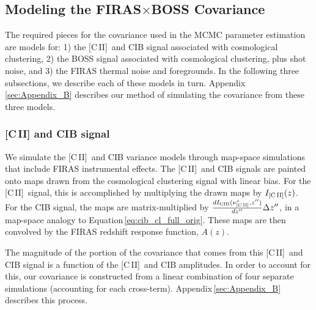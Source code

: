 \documentclass[fleqn,usenatbib]{mnras}
\newcommand{\cii}{[C{\sc\,II}]}
\newcommand{\FB}{FIRAS${\times}$BOSS}
\begin{document}
\subsection{Modeling the \texorpdfstring{\FB}{FIRASxBOSS} Covariance}
\label{subsec:FB_cov}
The required pieces for the covariance used in the MCMC parameter estimation are models for:  1) the \cii\ and CIB signal associated with cosmological clustering, 2) the BOSS signal associated with cosmological clustering, plus shot noise, and 3) the FIRAS thermal noise and foregrounds. In the following three subsections, we describe each of these models in turn. Appendix\,\ref{sec:Appendix_B} describes our method of simulating the covariance from these three models.

\subsubsection{\texorpdfstring{\cii}{[CII]} and CIB signal}
We simulate the \cii\ and CIB variance models through map-space simulations that include FIRAS instrumental effects. The \cii\ and CIB signals are painted onto maps drawn from the cosmological clustering signal with linear bias.  
For the \cii\ signal, this is accomplished by multiplying the drawn maps by $I_{\rm \cii}(z)$. For the CIB signal, the maps are matrix-multiplied by $\frac{dI_{\rm CIB}(\nu_{\rm \cii}^z,z'')}{dz''}\Delta z''$, in a map-space analogy to Equation\,\ref{eq:cib_cl_full_orig}. These maps are then convolved by the FIRAS redshift response function, $A(z)$. 

The magnitude of the portion of the covariance that comes from this \cii\ and CIB signal is a function of the \cii\ and CIB amplitudes. In order to account for this, our covariance is constructed from a linear combination of four separate simulations (accounting for each cross-term). Appendix\,\ref{sec:Appendix_B} describes this process.
\end{document}
